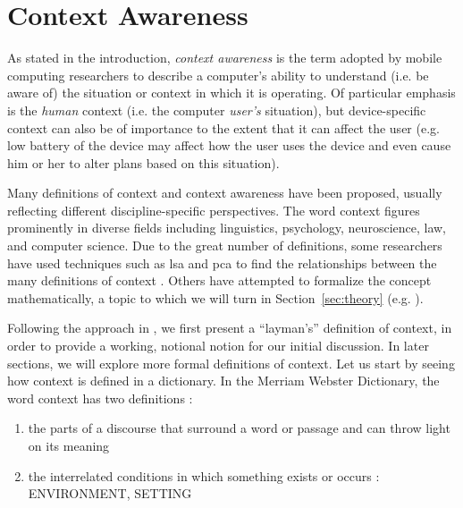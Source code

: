 \chapter{Context Awareness}
\label{ch:context_awareness}

As stated in the introduction, \emph{context awareness} is the term adopted by mobile computing researchers to describe a computer's ability to understand (i.e. be aware of) the situation or context in which it is operating. Of particular emphasis is the \emph{human} context (i.e. the computer \emph{user's} situation), but device-specific context can also be of importance to the extent that it can affect the user (e.g. low battery of the device may affect how the user uses the device and even cause him or her to alter plans based on this situation).

Many definitions of context and context awareness have been proposed, usually reflecting different discipline-specific perspectives. The word context figures prominently in diverse fields including linguistics, psychology, neuroscience, law, and computer science. Due to the great number of definitions, some researchers have used techniques such as \gls{lsa} and \gls{pca} to find the relationships between the many definitions of context \cite{Foltz1998} \cite{Bazire2005}. Others have attempted to formalize the concept mathematically, a topic to which we will turn in Section~\ref{sec:theory} (e.g. \cite{McCarthy1993}).

Following the approach in \cite{chen_geospatial_2014}, we first present a ``layman's'' definition of context, in order to provide a working, notional notion for our initial discussion. In later sections, we will explore more formal definitions of context. Let us start by seeing how context is defined in a dictionary. In the Merriam Webster Dictionary, the word context has two definitions \cite{merriam2015}:

\begin{enumerate}
  \item the parts of a discourse that surround a word or passage and can throw light on its meaning
  \item the interrelated conditions in which something exists or occurs : ENVIRONMENT, SETTING
\end{enumerate}

